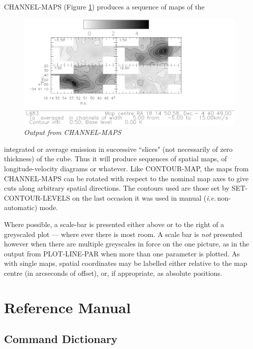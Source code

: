 \documentclass[11pt,twoside]{report}
\newcommand{\ie}{{\it i.e.\,}}
\begin{document}
CHANNEL-MAPS (Figure \ref{CHANMAP}) produces a sequence of maps of the
\begin{figure}[htbp]
\begin{center}
\includegraphics[scale=0.8]{chann-map.ps}
\protect\parbox{5.5in}
{\caption[CHANMAP]
{\sl
Output from CHANNEL-MAPS
\label{CHANMAP}
}
}
\end{center}
\end{figure}
integrated or average emission in successive ``slices" (not necessarily of zero
thickness) of the cube. Thus it will produce sequences of spatial maps, of
longitude-velocity diagrams  or whatever.
Like CONTOUR-MAP, the maps from CHANNEL-MAPS can be rotated with respect to the
nominal map axes to give cuts along arbitrary spatial directions. The contours
used are those set by SET-CONTOUR-LEVELS on the last occasion it was used in
manual (\ie non-automatic) mode.

Where possible, a scale-bar is presented either
above or to the right of a greyscaled plot --- where ever there is most room.
A scale bar is {\em not} presented however when there are multiple greyscales
in force on the one picture, as in the output from PLOT-LINE-PAR when more
than one parameter is plotted.
As with single maps, spatial coordinates may be labelled either relative to
the map centre (in arcseconds of offset), or, if appropriate, as absolute
positions.

\newpage
\part{Reference Manual}
\chapter{Command Dictionary}
\end{document}
